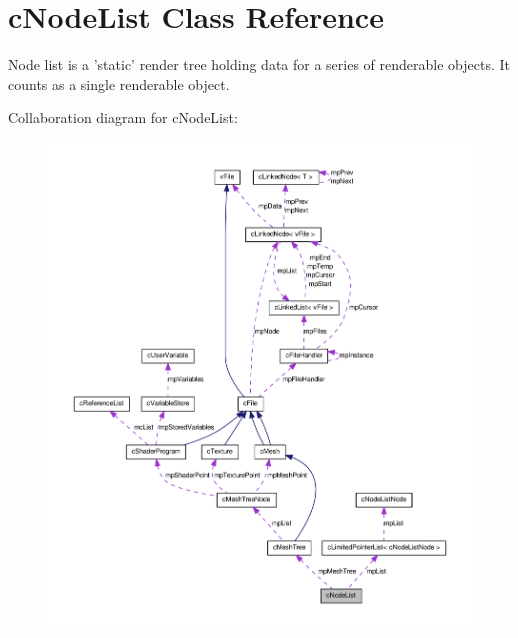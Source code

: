 \hypertarget{classc_node_list}{
\section{cNodeList Class Reference}
\label{classc_node_list}
}


Node list is a 'static' render tree holding data for a series of renderable objects. It counts as a single renderable object.  




Collaboration diagram for cNodeList:\nopagebreak
\begin{figure}[H]
\begin{center}
\leavevmode
\includegraphics[width=400pt]{classc_node_list__coll__graph}
\end{center}
\end{figure}
